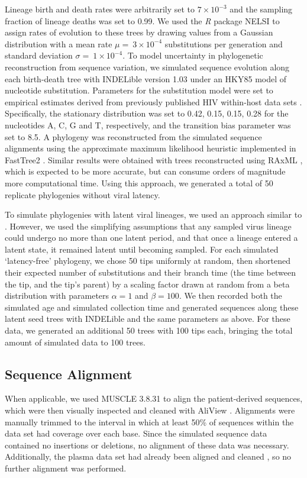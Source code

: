 \documentclass[12pt]{article}
\begin{document}
Lineage birth and death rates were arbitrarily set to $7\times 10^{-3}$ and the sampling fraction of lineage deaths was set to 0.99. 
We used the \textit{R} package NELSI to assign rates of evolution to these trees by drawing values from a Gaussian distribution with a mean rate $\mu = \ 3\times 10^{-4}$ substitutions per generation and standard deviation $\sigma = \ 1\times 10^{-4}$. %
To model uncertainty in phylogenetic reconstruction from sequence variation, we simulated sequence evolution along each birth-death tree with INDELible version 1.03 \citep{Indelible09} under an HKY85 \citep{HKY85} model of nucleotide substitution.
Parameters for the substitution model were set to empirical estimates derived from previously published HIV within-host data sets \citep{McCloskey14}. 
Specifically, the stationary distribution was set to 0.42, 0.15, 0.15, 0.28 for the nucleotides A, C, G and T, respectively, and the transition bias parameter was set to 8.5.
A phylogeny was reconstructed from the simulated sequence alignments using the approximate maximum likelihood heuristic implemented in FastTree2 \citep{FastTree10}.
Similar results were obtained with trees reconstructed using RAxML \citep{Raxml14}, which is expected to be more accurate, but can consume orders of magnitude more computational time.
Using this approach, we generated a total of 50 replicate phylogenies without viral latency. 

To simulate phylogenies with latent viral lineages, we used an approach similar to  \citet{Immonen14}. 
However, we used the simplifying assumptions that any sampled virus lineage could undergo no more than one latent period, and that once a lineage entered a latent state, it remained latent until becoming sampled.
For each simulated `latency-free' phylogeny, we chose 50 tips uniformly at random, then shortened their expected number of substitutions and their branch time (the time between the tip, and the tip's parent) by a scaling factor drawn at random from a beta distribution with parameters $\alpha=1$ and $\beta=100$.
We then recorded both the simulated age and simulated collection time and generated sequences along these latent seed trees with INDELible and the same parameters as above. 
For these data, we generated an additional 50 trees with 100 tips each, bringing the total amount of simulated data to 100 trees.


\subsection * {Sequence Alignment} \label{subsec:seqalign}
When applicable, we used MUSCLE 3.8.31 \citep{Muscle04} to align the patient-derived sequences, which were then visually inspected and cleaned with AliView \citep{AliView14}. 
Alignments were manually trimmed to the interval in which at least  50\% of sequences within the data set had coverage over each base.
Since the simulated sequence data contained no insertions or deletions, no alignment of these data was necessary. 
Additionally, the plasma data set had already been aligned and cleaned \citep{McCloskey14}, so no further alignment was performed.
\end{document}
